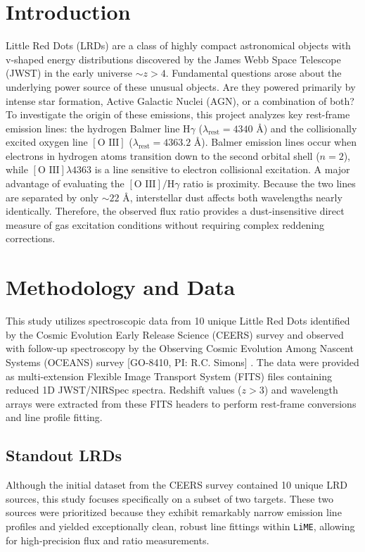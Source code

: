 \documentclass[twoside,twocolumn,10pt]{article}
\begin{document}
\section{Introduction}
\fontsize{12}{14}\selectfont
Little Red Dots (LRDs) are a class of highly compact astronomical objects with v-shaped energy distributions \citep{Davis2026} discovered by the James Webb Space Telescope (JWST) in the early universe $\sim z>4$. Fundamental questions arose about the underlying power source of these unusual objects. Are they powered primarily by intense star formation, Active Galactic Nuclei (AGN), or a combination of both? To investigate the origin of these  emissions, this project analyzes key rest-frame emission lines: the hydrogen Balmer line $\text{H}\gamma$ ($\lambda_{\text{rest}} = 4340\text{ \AA}$) and the collisionally excited oxygen line $[\text{O III}]$ ($\lambda_{\text{rest}} = 4363.2\text{ \AA}$). Balmer emission lines occur when electrons in hydrogen atoms transition down to the second orbital shell ($n=2$), while $[\text{O III}] \lambda 4363$ is a line sensitive to electron collisional excitation. A major advantage of evaluating the $[\text{O III}]/\text{H}\gamma$ ratio is proximity. Because the two lines are separated by only $\sim 22\text{ \AA}$, interstellar dust affects both wavelengths nearly identically. Therefore, the observed flux ratio provides a dust-insensitive direct measure of gas excitation conditions without requiring complex reddening corrections.\textit{
}


  

\section{Methodology and Data}
This study utilizes spectroscopic data from 10 unique Little Red Dots identified by the Cosmic Evolution Early Release Science (CEERS) survey and observed with follow-up spectroscopy by the Observing Cosmic Evolution
Among Nascent Systems (OCEANS) survey [GO-8410, PI: R.C. Simons] \citep{Finkelstein2025}. The data were provided as multi-extension Flexible Image Transport System (FITS) files containing reduced 1D JWST/NIRSpec spectra. Redshift values ($z > 3$) and wavelength arrays were extracted from these FITS headers to perform rest-frame conversions and line profile fitting. 
\fontsize{12}{14}\selectfont

\subsection{Standout LRDs}
\fontsize{12}{14}\selectfont
Although the initial dataset from the CEERS survey contained 10 unique LRD sources, this study focuses specifically on a subset of two targets. These two sources were prioritized because they exhibit remarkably narrow emission line profiles and yielded exceptionally clean, robust line fittings within \texttt{LiME}, allowing for high-precision flux and ratio measurements.
\end{document}
